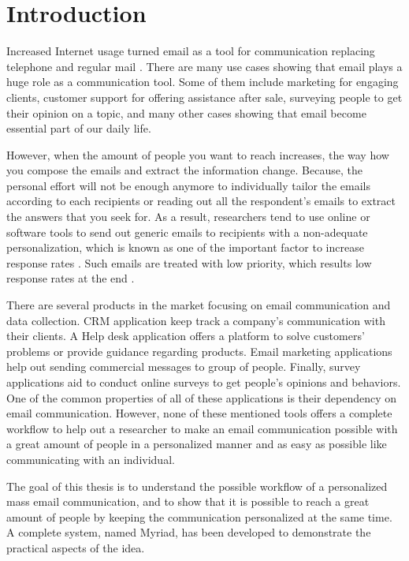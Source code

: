 \chapter{Introduction}
\label{chp:Intro}
Increased Internet usage turned email as a tool for communication replacing telephone and regular mail \citep{Norman2000,Madden2003}. There are many use cases showing that email plays a huge role as a communication tool. Some of them include marketing for engaging clients, customer support for offering assistance after sale, surveying people to get their opinion on a topic, and many other cases showing that email become essential part of our daily life.
\vspace{1cm}

However, when the amount of people you want to reach increases, the way how you compose the emails and extract the information change. Because, the personal effort will not be enough anymore to individually tailor the emails according to each recipients or reading out all the respondent's emails to extract the answers that you seek for. As a result, researchers tend to use online or software tools to send out generic emails to recipients with a non-adequate personalization, which is known as one of the important factor to increase response rates \citep{Dillman1991,Schaefer1998}. Such emails are treated with low priority, which results low response rates at the end \citep[page 272]{DillmanDonA.SmythJoleneD.Christian2009}.
\vspace{1cm}

There are several products in the market focusing on email communication and data collection. \ac{CRM} application keep track a company's communication with their clients. A Help desk application offers a platform to solve customers' problems or provide guidance regarding products. Email marketing applications help out sending commercial messages to group of people. Finally, survey applications aid to conduct online surveys to get people's opinions and behaviors. One of the common properties of all of these applications is their dependency on email communication. However, none of these mentioned tools offers a complete workflow to help out a researcher to make an email communication possible with a great amount of people in a personalized manner and as easy as possible like communicating with an individual.
\vspace{1cm}

The goal of this thesis is to understand the possible workflow of a personalized mass email communication, and to show that it is possible to reach a great amount of people by keeping the communication personalized at the same time. A complete system, named Myriad, has been developed to demonstrate the practical aspects of the idea.

